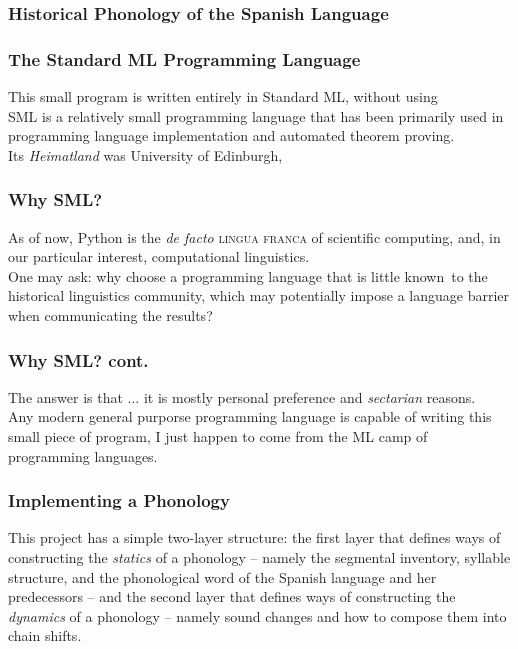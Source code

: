 \documentclass{beamer}
\begin{document}
\begin{frame}
  \frametitle{Historical Phonology of the Spanish Language}
\end{frame}

\begin{frame}
  \frametitle{The Standard ML Programming Language}

  This small program is written entirely in Standard ML, without using \\
  SML is a relatively small programming language that has been primarily used in programming language implementation and automated theorem proving. \\
  Its \emph{Heimatland} was University of Edinburgh,
\end{frame}

\begin{frame}
  \frametitle{Why SML?}

  As of now, Python is the \emph{de facto} \textsc{lingua franca} of scientific computing, and, in our particular interest, computational linguistics. \\
  One may ask: why choose a programming language that is little known\footnotemark\ to the historical linguistics community, which may potentially impose a language barrier when communicating the results? \\
\end{frame}

\begin{frame}
  \frametitle{Why SML? cont.}

  The answer is that $\dots$ it is mostly personal preference and \emph{sectarian} reasons. \\
  Any modern general purporse programming language is capable of writing this small piece of program, I just happen to come from the ML camp of programming languages.
\end{frame}

\begin{frame}
  \frametitle{Implementing a Phonology}

  This project has a simple two-layer structure: the first layer that defines ways of constructing the \emph{statics} of a phonology -- namely the segmental inventory, syllable structure, and the phonological word of the Spanish language and her predecessors -- and the second layer that defines ways of constructing the \emph{dynamics} of a phonology -- namely sound changes and how to compose them into chain shifts.
\end{frame}
\end{document}
